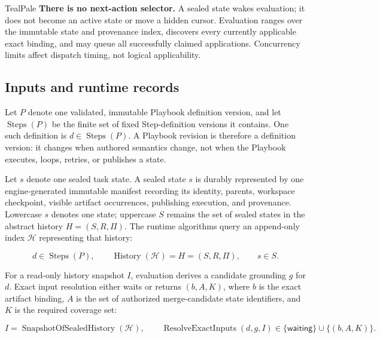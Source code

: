 \documentclass[11pt]{article}
\begin{document}
\begin{decisionbox}{TealPale}
\textbf{There is no next-action selector.} A sealed state wakes evaluation; it
does not become an active state or move a hidden cursor. Evaluation ranges over
the immutable state and provenance index, discovers every currently applicable
exact binding, and may queue all successfully claimed applications.
Concurrency limits affect dispatch timing, not logical applicability.
\end{decisionbox}

\subsection{Inputs and runtime records}

Let \(P\) denote one validated, immutable Playbook definition version, and let
\(\operatorname{Steps}(P)\) be the finite set of fixed Step-definition versions
it contains. One such definition is \(d\in\operatorname{Steps}(P)\). A Playbook
revision is therefore a definition version: it changes when authored semantics
change, not when the Playbook executes, loops, retries, or publishes a state.

Let \(s\) denote one sealed task state. A sealed state \(s\) is durably
represented by one engine-generated immutable manifest recording its identity,
parents, workspace checkpoint, visible artifact occurrences, publishing
execution, and provenance. Lowercase \(s\) denotes one state; uppercase \(S\)
remains the set of sealed states in the abstract history \(H=(S,R,\Pi)\).
The runtime algorithms query an append-only index \(\mathcal{H}\) representing
that history:

\begin{equation}
  d\in\operatorname{Steps}(P),\qquad
  \operatorname{History}(\mathcal{H})=H=(S,R,\Pi),\qquad
  s\in S.
\end{equation}

For a read-only history snapshot \(I\), evaluation derives a candidate grounding
\(g\) for \(d\). Exact input resolution either waits or returns
\((b,A,K)\), where \(b\) is the exact artifact binding, \(A\) is the set of
authorized merge-candidate state identifiers, and \(K\) is the required
coverage set:

\begin{equation}
  I=\operatorname{SnapshotOfSealedHistory}(\mathcal{H}),\qquad
  \operatorname{ResolveExactInputs}(d,g,I)
  \in \{\mathsf{waiting}\}\cup\{(b,A,K)\}.
\end{equation}
\end{document}

